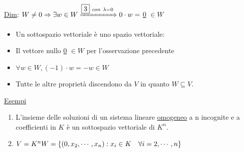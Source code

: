 \documentclass{article}
\newcommand{\ul}[1]{\underline{#1}}
\begin{document}
	\ul{Dim}: $W\not=0\Rightarrow\exists w\in W\xRightarrow{\boxed{3}\ con\ \lambda=0}0\cdot w=$ \ul{0} $\in W$
	\begin{itemize}
		\item Un sottospazio vettoriale è uno spazio vettoriale:
		\item Il vettore nullo \ul{0} $\in W$ per l'osservazione precedente
		\item $\forall w\in W,(-1)\cdot w=-w\in W$
		\item Tutte le altre proprietà discendono da $V$ in quanto $W\subseteq V$.
	\end{itemize}

	\ul{Esempi}
	\begin{enumerate}
		\item L'insieme delle soluzioni di un sistema lineare \ul{omogeneo} a n incognite e a coefficienti in $K$ è un sottospazio vettoriale di $K^n$.
		\item $V=K^n\\W=\{(0,x_2,\cdots,x_n):x_i\in K\quad\forall i=2,\cdots,n\}$
	\end{enumerate}
\end{document}
